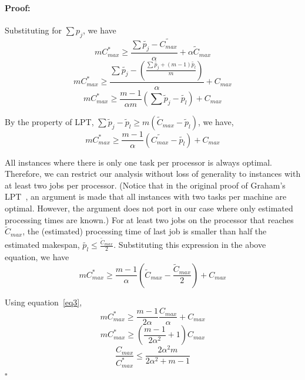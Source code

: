 \documentclass[12pt]{article}
\theoremstyle{mystyle}
\newenvironment{myproof}{\paragraph{Proof:}}{\hfill$\square$}
\begin{document}
\begin{myproof}
   Substituting for  $ \sum {p_j}$, we have
    \begin{equation}\nonumber 
    m C_{max}^{*}\geq \frac{\sum \tilde{p_j}- \tilde{C_{max}}}{\alpha} + \alpha \tilde C_{max}
    \end{equation} 
   \begin{equation}\nonumber 
    m C_{max}^{*}\geq \frac{\sum \tilde{p_j} - \left( \frac{\sum{\tilde{p_j} + (m-1) \tilde{p_l} }}{m} \right )} {\alpha} + {C_{max}}
   \end{equation}
   \begin{equation}\nonumber
    m C_{max}^{*}\geq \frac{m-1}{\alpha m} \left( \sum \tilde p_j - \tilde{p_l} \right) + {C_{max}}
    \end{equation}
   
    By the property of LPT, $\sum \tilde p_j-\tilde p_l \geq m (\tilde C_{max}-\tilde p_l)$, we have,
   \begin{equation}\nonumber 
     m C_{max}^{*}\geq \frac{m-1}{\alpha } \left( \tilde{C_{max}} - \tilde{ p_l} \right) + {C_{max}}
    \end{equation}
    
    All instances where there is only one task per processor is always
    optimal. Therefore, we can restrict our analysis without loss of
    generality to instances with at least two jobs per processor. (Notice
    that in the original proof of Graham's LPT~\cite{Graham69boundson},
    an argument is made that all instances with two tasks per machine are
    optimal. However, the argument does not port in our case where only
    estimated processing times are known.) For at least two jobs on the
    processor that reaches $\tilde{C}_{max}$, the (estimated)
    processing time of last job is smaller than half the estimated
    makespan, $\tilde{p_l} \leq \frac{\tilde{C}_{max}}{2}$. Substituting
    this expression in the above equation, we have
   \begin{equation}\nonumber
    m C_{max}^{*}\geq \frac{m-1}{\alpha } \left( \tilde C_{max}-\frac{\tilde C_{max}}{2} \right ) + {C_{max}}
   \end{equation}
   
   Using equation~\ref{eq3},
   \begin{equation}\nonumber
    m C_{max}^{*}\geq \frac{m-1}{2\alpha } \frac{C_{max}} {\alpha} + {C_{max}}
   \end{equation}
   \begin{equation}\nonumber
    m C_{max}^{*}\geq \left( \frac{m-1}{2\alpha^{2} } +1\right){C_{max}}
   \end{equation}
   \begin{equation}\nonumber
   \frac{C_{max}}{C_{max}^{*}}\leq \frac{2\alpha^{2}m}{2\alpha^{2}+ m-1}
   \end{equation}
   \end{myproof} 
   
\end{document}
